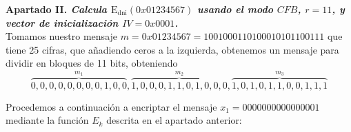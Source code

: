 \documentclass[fleqn]{article}
\begin{document}



    \newpage
    \textbf{Apartado II. \textit{Calcula $\text{E}_{\text{dni}}(0x01234567)$ usando el modo $CFB$, $r=11$, y vector de 
            inicialización $IV = 0x0001$.}}\\

    Tomamos nuestro mensaje $m = 0x01234567 = 1001000110100010101100111$ que tiene 25 cifras, que añadiendo ceros a la izquierda,
    obtenemos un mensaje para dividir en bloques de 11 bits, obteniendo
    $$\overbrace{0,0,0,0,0,0,0,0,1,0,0}^{m_1},\overbrace{1,0,0,0,1,1,0,1,0,0,0}^{m_2},\overbrace{1,0,1,0,1,1,0,0,1,1,1}^{m_3} $$

    Procedemos a continuación a encriptar el mensaje $x_1 = 0000000000000001$ mediante la función $E_k$ descrita en el apartado anterior:
\end{document}
